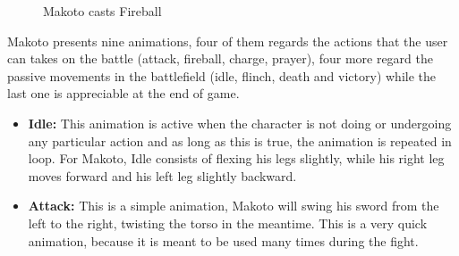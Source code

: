 \begin{figure}
    \centering
    \caption{Makoto casts Fireball}
    \label{fig:fireball}
\end{figure}

Makoto presents nine animations, four of them regards the actions that the user can takes on the battle (attack, fireball, charge, prayer), four more regard the passive movements in the battlefield (idle, flinch, death and victory) while the last one is appreciable at the end of game.



\begin{itemize}
    \item \textbf{Idle:} This animation is active when the character is not doing or undergoing any particular action and as long as this is true, the animation is repeated in loop. For Makoto, Idle consists of flexing his legs slightly, while his right leg moves forward and his left leg slightly backward.
    
    \item \textbf{Attack:} This is a simple animation, Makoto will swing his sword from the left to the right, twisting the torso in the meantime. This is a very quick animation, because it is meant to be used many times during the fight.
\end{itemize}

